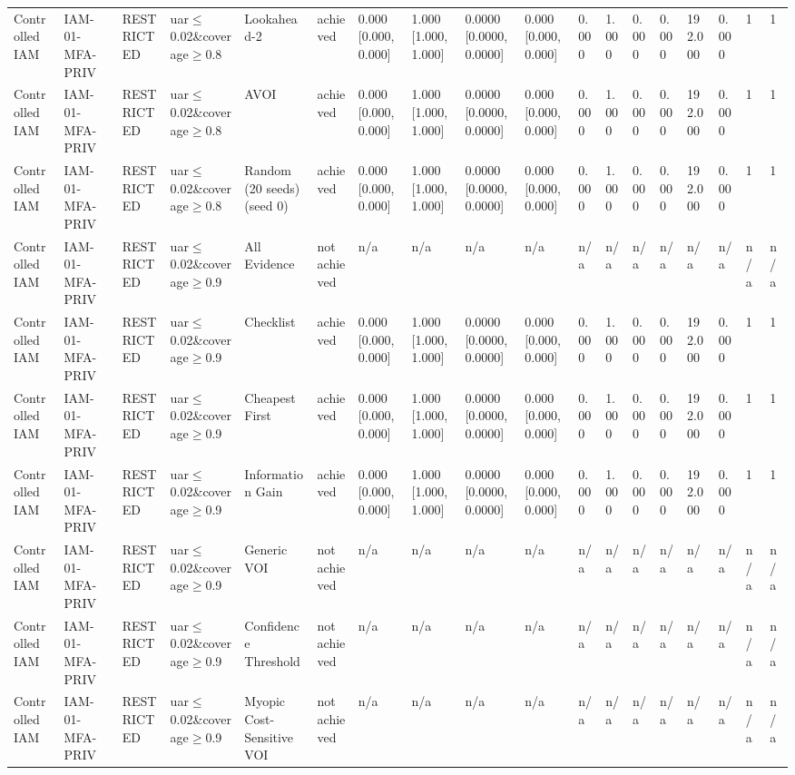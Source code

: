\begin{table}[!ht]
{\begin{tabular}{llllllllllllllllll}
Controlled IAM & IAM-01-MFA-PRIV & RESTRICTED & uar$\le$0.02\&coverage$\ge$0.8 & Lookahead-2 & achieved & 0.000 [0.000, 0.000] & 1.000 [1.000, 1.000] & 0.0000 [0.0000, 0.0000] & 0.000 [0.000, 0.000] & 0.000 & 1.000 & 0.000 & 0.000 & 192.000 & 0.000 & 1 & 1 \\
Controlled IAM & IAM-01-MFA-PRIV & RESTRICTED & uar$\le$0.02\&coverage$\ge$0.8 & AVOI & achieved & 0.000 [0.000, 0.000] & 1.000 [1.000, 1.000] & 0.0000 [0.0000, 0.0000] & 0.000 [0.000, 0.000] & 0.000 & 1.000 & 0.000 & 0.000 & 192.000 & 0.000 & 1 & 1 \\
Controlled IAM & IAM-01-MFA-PRIV & RESTRICTED & uar$\le$0.02\&coverage$\ge$0.8 & Random (20 seeds) (seed 0) & achieved & 0.000 [0.000, 0.000] & 1.000 [1.000, 1.000] & 0.0000 [0.0000, 0.0000] & 0.000 [0.000, 0.000] & 0.000 & 1.000 & 0.000 & 0.000 & 192.000 & 0.000 & 1 & 1 \\
Controlled IAM & IAM-01-MFA-PRIV & RESTRICTED & uar$\le$0.02\&coverage$\ge$0.9 & All Evidence & not achieved & n/a & n/a & n/a & n/a & n/a & n/a & n/a & n/a & n/a & n/a & n/a & n/a \\
Controlled IAM & IAM-01-MFA-PRIV & RESTRICTED & uar$\le$0.02\&coverage$\ge$0.9 & Checklist & achieved & 0.000 [0.000, 0.000] & 1.000 [1.000, 1.000] & 0.0000 [0.0000, 0.0000] & 0.000 [0.000, 0.000] & 0.000 & 1.000 & 0.000 & 0.000 & 192.000 & 0.000 & 1 & 1 \\
Controlled IAM & IAM-01-MFA-PRIV & RESTRICTED & uar$\le$0.02\&coverage$\ge$0.9 & Cheapest First & achieved & 0.000 [0.000, 0.000] & 1.000 [1.000, 1.000] & 0.0000 [0.0000, 0.0000] & 0.000 [0.000, 0.000] & 0.000 & 1.000 & 0.000 & 0.000 & 192.000 & 0.000 & 1 & 1 \\
Controlled IAM & IAM-01-MFA-PRIV & RESTRICTED & uar$\le$0.02\&coverage$\ge$0.9 & Information Gain & achieved & 0.000 [0.000, 0.000] & 1.000 [1.000, 1.000] & 0.0000 [0.0000, 0.0000] & 0.000 [0.000, 0.000] & 0.000 & 1.000 & 0.000 & 0.000 & 192.000 & 0.000 & 1 & 1 \\
Controlled IAM & IAM-01-MFA-PRIV & RESTRICTED & uar$\le$0.02\&coverage$\ge$0.9 & Generic VOI & not achieved & n/a & n/a & n/a & n/a & n/a & n/a & n/a & n/a & n/a & n/a & n/a & n/a \\
Controlled IAM & IAM-01-MFA-PRIV & RESTRICTED & uar$\le$0.02\&coverage$\ge$0.9 & Confidence Threshold & not achieved & n/a & n/a & n/a & n/a & n/a & n/a & n/a & n/a & n/a & n/a & n/a & n/a \\
Controlled IAM & IAM-01-MFA-PRIV & RESTRICTED & uar$\le$0.02\&coverage$\ge$0.9 & Myopic Cost-Sensitive VOI & not achieved & n/a & n/a & n/a & n/a & n/a & n/a & n/a & n/a & n/a & n/a & n/a & n/a \\

\end{tabular}}
\end{table}
